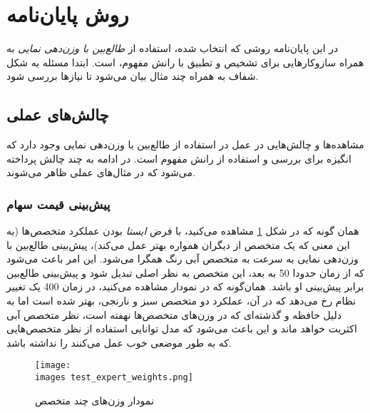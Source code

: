 \documentclass[a4paper,11px]{article}
\begin{document}
\section{
روش پایان‌نامه
}



در این پایان‌نامه روشی که انتخاب شده، استفاده از 
\textit{
طالع‌بین با وزن‌دهی نمایی
} 
به همراه سازوکارهایی برای تشخیص و تطبیق با رانش مفهوم، است. ابتدا مسئله به شکل شفاف به همراه چند مثال بیان می‌شود تا نیازها بررسی شود.

\subsection{
چالش‌های عملی
}

مشاهده‌ها و چالش‌هایی در عمل در استفاده از طالع‌بین با وزن‌دهی نمایی وجود دارد که انگیزه برای بررسی و استفاده از رانش مفهوم است. در ادامه به چند چالش پرداخته می‌شود که در مثال‌های عملی ظاهر می‌شوند.

\subsubsection{
پیش‌بینی قیمت سهام
}



همان گونه که در شکل 
\ref{fig:wmstatic} 
مشاهده می‌کنید، با فرض 
\textit{
ایستا
} 
بودن عملکرد متخصص‌ها (به این معنی که یک متخصص از دیگران همواره بهتر عمل می‌کند)، پیش‌بینی طالع‌بین با وزن‌دهی نمایی به سرعت به متخصص آبی رنگ همگرا می‌شود. این امر باعث می‌شود که از زمان حدودا 50 به بعد، این متخصص به نظر اصلی تبدیل شود و پیش‌بینی طالع‌بین برابر پیش‌بینی او باشد. همان‌گونه که در نمودار مشاهده می‌کنید، در زمان 400 یک تغییر نظام رخ می‌دهد که در آن، عملکرد دو متخصص سبز و نارنجی، بهتر شده است اما به دلیل حافظه و گذشته‌ای که در وزن‌های متخصص‌ها نهفته است، نظر متخصص آبی اکثریت خواهد ماند و این باعث می‌شود که مدل توانایی استفاده از نظر متخصص‌هایی که به طور موضعی خوب عمل می‌کنند را نداشته باشد.


\begin{figure}[h!]
\texttt{[image: \\images test\_expert\_weights.png]}
\caption{
نمودار وزن‌های چند متخصص
}
\label{fig:wmstatic}
\end{figure}
\end{document}
